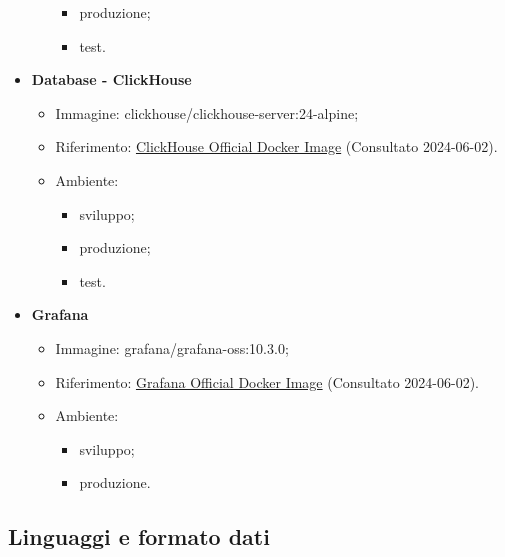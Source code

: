 \begin{itemize}
\begin{itemize}
\begin{itemize}
            \item produzione;
            \item test.
        \end{itemize}
    \end{itemize}
    \item \textbf{Database - ClickHouse}
    \begin{itemize}
        \item Immagine: clickhouse/clickhouse-server:24-alpine;
        \item Riferimento: \href{https://hub.docker.com/r/clickhouse/clickhouse-server}{ClickHouse Official Docker Image} (Consultato 2024-06-02).
        \item Ambiente: 
        \begin{itemize}
            \item sviluppo;
            \item produzione;
            \item test.
        \end{itemize}
    \end{itemize}
    \item \textbf{Grafana}
    \begin{itemize}
        \item Immagine: grafana/grafana-oss:10.3.0;
        \item Riferimento: \href{https://hub.docker.com/r/grafana/grafana-oss}{Grafana Official Docker Image} (Consultato 2024-06-02).
        \item Ambiente: 
        \begin{itemize}
            \item sviluppo;
            \item produzione.
        \end{itemize}
    \end{itemize}
\end{itemize}
\subsection{Linguaggi e formato dati}
